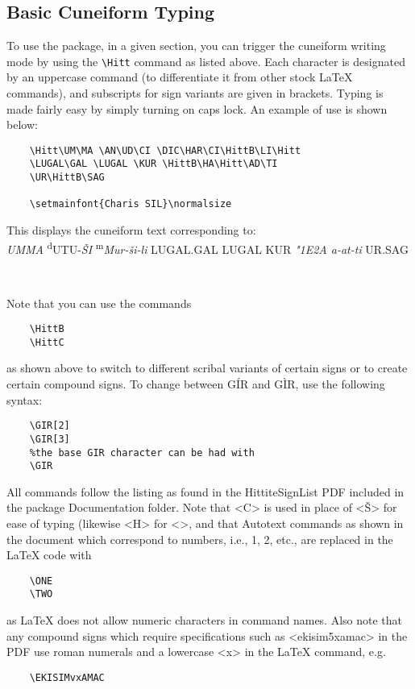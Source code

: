 \documentclass[12pt,A4]{article}
\begin{document}
\subsection{Basic Cuneiform Typing}
To use the package, in a given section, you can trigger the cuneiform writing mode by using the \verb|\Hitt| command as listed above. Each character is designated by an uppercase command (to differentiate it from other stock LaTeX commands), and subscripts for sign variants are given in brackets. Typing is made fairly easy by simply turning on caps lock. An example of use is shown below:
\begin{verbatim}
    \Hitt\UM\MA \AN\UD\CI \DIC\HAR\CI\HittB\LI\Hitt 
    \LUGAL\GAL \LUGAL \KUR \HittB\HA\Hitt\AD\TI 
    \UR\HittB\SAG

    \setmainfont{Charis SIL}\normalsize
\end{verbatim}
This displays the cuneiform text corresponding to: 
\\

\textit{UMMA} \textsuperscript{d}UTU-\textit{\v{S}I} \textsuperscript{m}\textit{Mur-\v{s}i-li} LUGAL.GAL LUGAL KUR \textit{\char"1E2A a-at-ti} UR.SAG

    \Hitt\UM\MA \AN\UD\CI \DIC\HAR\CI\HittB\LI\Hitt \LUGAL\GAL \LUGAL \KUR \HittB\HA\Hitt\AD\TI \UR\HittB\SAG\\

\setmainfont{Charis SIL}\normalsize

Note that you can use the commands
\begin{verbatim}
    \HittB
    \HittC
\end{verbatim}
as shown above to switch to different scribal variants of certain signs or to create certain compound signs. To change between G\'IR and G\`IR, use the following syntax:
\begin{verbatim}
    \GIR[2]
    \GIR[3]
    %the base GIR character can be had with
    \GIR
\end{verbatim}

\Hitt\GIR\GIR[2]\GIR[3]\Lat

All commands follow the listing as found in the HittiteSignList PDF included in the package Documentation folder. Note that <C> is used in place of <\v{S}> for ease of typing (likewise <H> for <\funH>, and that Autotext commands as shown in the document which correspond to numbers, i.e., 1, 2, etc., are replaced in the LaTeX code with 
\begin{verbatim}
    \ONE
    \TWO
\end{verbatim}
as LaTeX does not allow numeric characters in command names. Also note that any compound signs which require specifications such as <ekisim5xamac> in the PDF use roman numerals and a lowercase <x> in the LaTeX command, e.g. 
\begin{verbatim}
    \EKISIMvxAMAC
\end{verbatim}
\end{document}
